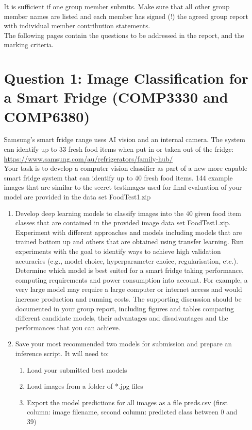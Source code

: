 \documentclass[runningheads]{llncs}
\begin{document}
\noindent It is suﬃcient if one group member submits. Make sure that all other group member names are listed and each member has signed (!) the agreed group report with individual member contribution statements. \\

\noindent The following pages contain the questions to be addressed in the report, and the marking criteria.

\newpage

\section*{Question 1: Image Classification for a Smart Fridge (COMP3330 and COMP6380)}

\noindent Samsung’s smart fridge range uses AI vision and an internal camera. The system can identify up to 33 fresh food items when put in or taken out of the fridge: \\

\url{https://www.samsung.com/au/refrigerators/family-hub/} \\

\noindent Your task is to develop a computer vision classifier as part of a new more capable smart fridge system that can identify up to 40 fresh food items. 144 example images that are similar to the secret testimages used for final evaluation of your model are provided in the data set FoodTest1.zip \\
\begin{enumerate}
    \item Develop deep learning models to classify images into the 40 given food item classes that are contained in the provided image data set FoodTest1.zip. Experiment with different approaches and models including models that are trained bottom up and others that are obtained using transfer learning. Run experiments with the goal to identify ways to achieve high validation accuracies (e.g., model choice, hyperparameter choice, regularisation, etc.). Determine which model is best suited for a smart fridge taking performance, computing requirements and power consumption into account. For example, a very large model may require a large computer or internet access and would increase production and running costs. The supporting discussion should be documented in your group report, including figures and tables comparing different candidate models, their advantages and disadvantages and the performances that you can achieve.
    \item Save your most recommended two models for submission and prepare an inference script. It will need to:
    \begin{enumerate}
        \item Load your submitted best models
        \item Load images from a folder of *.jpg files
        \item Export the model predictions for all images as a ﬁle preds.csv (ﬁrst column: image ﬁlename, second column: predicted class between 0 and 39)
    \end{enumerate}
\end{enumerate}
\end{document}
